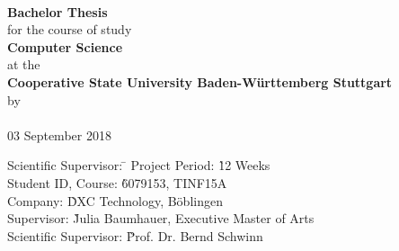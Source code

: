 \begin{titlepage}

\begin{minipage}{\textwidth}
		\vspace{-2cm}
		\noindent
		\hfill
\end{minipage}

\enlargethispage{20mm}

\sffamily
\begin{center}
    \vspace*{12mm}  {\large\textbf{\dertitel}}       \\
    \vspace*{12mm}  {\large\textbf{Bachelor Thesis}}        \\
    \vspace*{24mm}   for the course of study         \\
    \vspace*{3mm}   {\large\textbf{Computer Science}} \\
    \vspace*{3mm}   at the                         \\
    \vspace*{3mm}   {\large\textbf{Cooperative State University Baden-Württemberg Stuttgart}}  \\
    \vspace*{12mm}  by                              \\
    \vspace*{3mm}   {\large\textbf{\derautor}}      \\
    \vspace*{12mm}  03 September 2018 \\

\vfill

\begin{minipage}{\textwidth}

\begin{tabbing}
	Scientific Supervisor: \hspace{1.85cm} \= \kill
	Project Period: \` 12 Weeks \\[1.5mm]
	Student ID, Course: \` 6079153, TINF15A\\[1.5mm]
	Company: \` DXC Technology, Böblingen\\[1.5mm]
	Supervisor: \` Julia Baumhauer, Executive Master of Arts\\[1.5mm]
	Scientific Supervisor: \` Prof. Dr. Bernd Schwinn \\[1.5mm]

\end{tabbing}
\end{minipage}

\end{center}

\end{titlepage}
